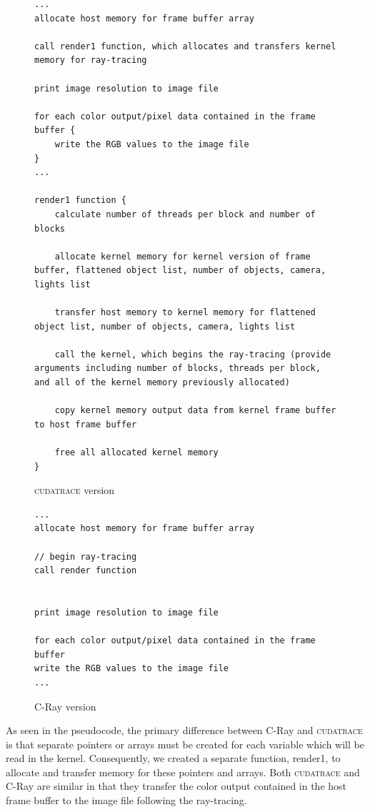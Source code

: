 \documentclass[12pt]{article}
\begin{document}
\begin{figure}[H]
    \caption{\textsc{cudatrace} version} \label{code:cudatrace_basic}
\begin{lstlisting}
...
allocate host memory for frame buffer array

call render1 function, which allocates and transfers kernel memory for ray-tracing
 
print image resolution to image file

for each color output/pixel data contained in the frame buffer {
    write the RGB values to the image file
}
...

render1 function {
    calculate number of threads per block and number of blocks
      
    allocate kernel memory for kernel version of frame buffer, flattened object list, number of objects, camera, lights list    
        
    transfer host memory to kernel memory for flattened object list, number of objects, camera, lights list

    call the kernel, which begins the ray-tracing (provide arguments including number of blocks, threads per block, and all of the kernel memory previously allocated)

    copy kernel memory output data from kernel frame buffer to host frame buffer

    free all allocated kernel memory
}  

\end{lstlisting}
\end{figure}

\begin{figure}[H]
    \caption{C-Ray version} \label{code:c-ray_basic}
\begin{lstlisting}
...
allocate host memory for frame buffer array

// begin ray-tracing
call render function 


print image resolution to image file

for each color output/pixel data contained in the frame buffer
write the RGB values to the image file
...
\end{lstlisting}
\end{figure}

As seen in the pseudocode, the primary difference between C-Ray and \textsc{cudatrace} is that separate pointers or arrays must be created for each variable which will be read in the kernel. Consequently, we created a separate function, render1, to allocate and transfer memory for these pointers and arrays. Both \textsc{cudatrace} and C-Ray are similar in that they transfer the color output contained in the host frame buffer to the image file following the ray-tracing. 
\end{document}
